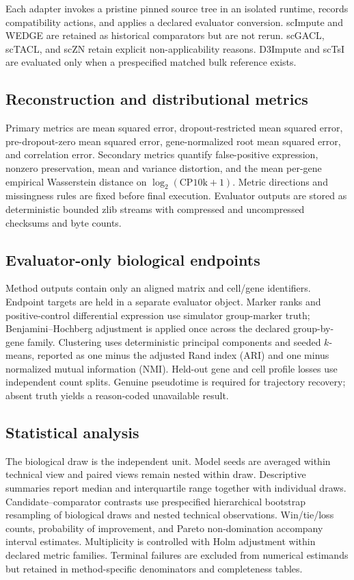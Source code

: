 \documentclass[pdflatex,sn-vancouver-num,referee,lineno]{sn-jnl}
\begin{document}
Each adapter invokes a pristine pinned source tree in an isolated runtime, records compatibility actions, and applies a declared evaluator conversion. scImpute and WEDGE are retained as historical comparators but are not rerun. scGACL, scTACL, and scZN retain explicit non-applicability reasons. D3Impute and scTsI are evaluated only when a prespecified matched bulk reference exists.

\subsection{Reconstruction and distributional metrics}

Primary metrics are mean squared error, dropout-restricted mean squared error, pre-dropout-zero mean squared error, gene-normalized root mean squared error, and correlation error. Secondary metrics quantify false-positive expression, nonzero preservation, mean and variance distortion, and the mean per-gene empirical Wasserstein distance on $\log_2(\mathrm{CP10k}+1)$. Metric directions and missingness rules are fixed before final execution. Evaluator outputs are stored as deterministic bounded zlib streams with compressed and uncompressed checksums and byte counts.

\subsection{Evaluator-only biological endpoints}

Method outputs contain only an aligned matrix and cell/gene identifiers. Endpoint targets are held in a separate evaluator object. Marker ranks and positive-control differential expression use simulator group-marker truth; Benjamini--Hochberg adjustment is applied once across the declared group-by-gene family. Clustering uses deterministic principal components and seeded $k$-means, reported as one minus the adjusted Rand index (ARI) and one minus normalized mutual information (NMI). Held-out gene and cell profile losses use independent count splits. Genuine pseudotime is required for trajectory recovery; absent truth yields a reason-coded unavailable result.

\subsection{Statistical analysis}

The biological draw is the independent unit. Model seeds are averaged within technical view and paired views remain nested within draw. Descriptive summaries report median and interquartile range together with individual draws. Candidate--comparator contrasts use prespecified hierarchical bootstrap resampling of biological draws and nested technical observations. Win/tie/loss counts, probability of improvement, and Pareto non-domination accompany interval estimates. Multiplicity is controlled with Holm adjustment within declared metric families. Terminal failures are excluded from numerical estimands but retained in method-specific denominators and completeness tables.
\end{document}
